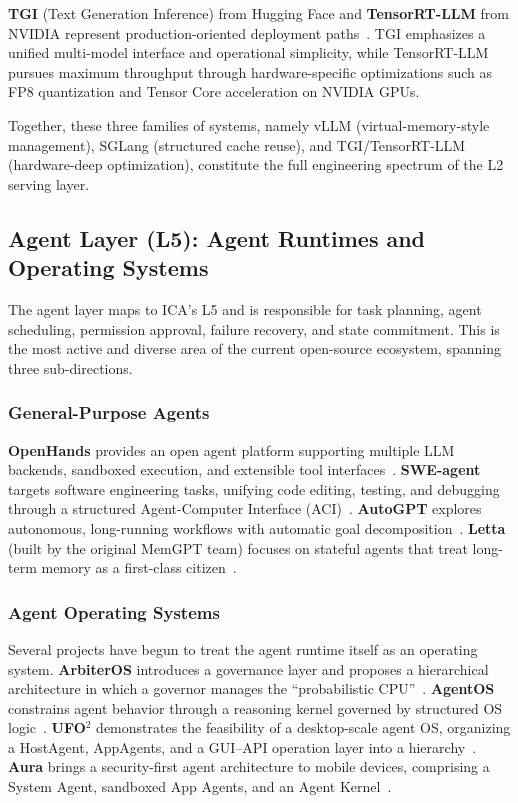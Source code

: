 \textbf{TGI} (Text Generation Inference) from Hugging Face and \textbf{TensorRT-LLM} from NVIDIA represent production-oriented deployment paths~\cite{tgi_docs_2026,tensorrtllm_docs_2026}. TGI emphasizes a unified multi-model interface and operational simplicity, while TensorRT-LLM pursues maximum throughput through hardware-specific optimizations such as FP8 quantization and Tensor Core acceleration on NVIDIA GPUs.

Together, these three families of systems, namely vLLM (virtual-memory-style management), SGLang (structured cache reuse), and TGI/TensorRT-LLM (hardware-deep optimization), constitute the full engineering spectrum of the L2 serving layer.

\subsection{Agent Layer (L5): Agent Runtimes and Operating Systems}
\label{sec:impl-agent}

The agent layer maps to ICA's L5 and is responsible for task planning, agent scheduling, permission approval, failure recovery, and state commitment. This is the most active and diverse area of the current open-source ecosystem, spanning three sub-directions.

\subsubsection{General-Purpose Agents}

\textbf{OpenHands} provides an open agent platform supporting multiple LLM backends, sandboxed execution, and extensible tool interfaces~\cite{openhands_paper_2025}. \textbf{SWE-agent} targets software engineering tasks, unifying code editing, testing, and debugging through a structured Agent-Computer Interface (ACI)~\cite{sweagent2024}. \textbf{AutoGPT} explores autonomous, long-running workflows with automatic goal decomposition~\cite{autogpt_platform_2026}. \textbf{Letta} (built by the original MemGPT team) focuses on stateful agents that treat long-term memory as a first-class citizen~\cite{letta_stateful_2026}.

\subsubsection{Agent Operating Systems}

Several projects have begun to treat the agent runtime itself as an operating system. \textbf{ArbiterOS} introduces a governance layer and proposes a hierarchical architecture in which a governor manages the ``probabilistic CPU''~\cite{arbiteros2025}. \textbf{AgentOS} constrains agent behavior through a reasoning kernel governed by structured OS logic~\cite{agentos2025}. \textbf{UFO$^2$} demonstrates the feasibility of a desktop-scale agent OS, organizing a HostAgent, AppAgents, and a GUI--API operation layer into a hierarchy~\cite{ufo2_2025}. \textbf{Aura} brings a security-first agent architecture to mobile devices, comprising a System Agent, sandboxed App Agents, and an Agent Kernel~\cite{aura2025}.

